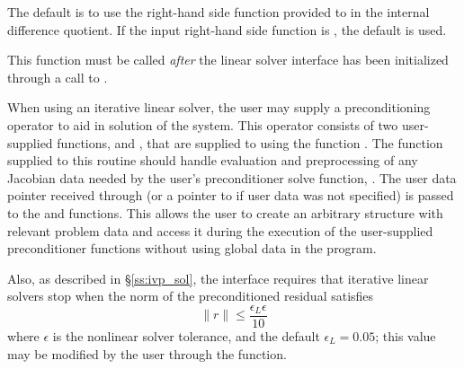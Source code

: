 {
  The default is to use the right-hand side function provided to 
  in the internal difference quotient. If the input right-hand side function is
  , the default is used.

  This function must be called \emph{after} the {\cvls} linear solver interface
  has been initialized through a call to .
}
When using an iterative linear solver, the user may supply a
preconditioning operator to aid in solution of the system.  This
operator consists of two user-supplied functions,  and
, that are supplied to {\cvodes} using the function
.  The  function supplied to
this routine should handle evaluation and preprocessing of any
Jacobian data needed by the user's preconditioner solve function,
.  The user data pointer received through
 (or a pointer to  if user data was not
specified) is passed to the  and  functions.
This allows the user to create an arbitrary structure with relevant
problem data and access it during the execution of the user-supplied
preconditioner functions without using global data in the program.

Also, as described in \S\ref{ss:ivp_sol}, the {\cvls} interface
requires that iterative linear solvers stop when the norm of the
preconditioned residual satisfies
\[
  \|r\| \le \frac{\epsilon_L \epsilon}{10}
\]
where $\epsilon$ is the nonlinear solver tolerance, and the default
$\epsilon_L = 0.05$; this value may be modified by the user through
the  function.



